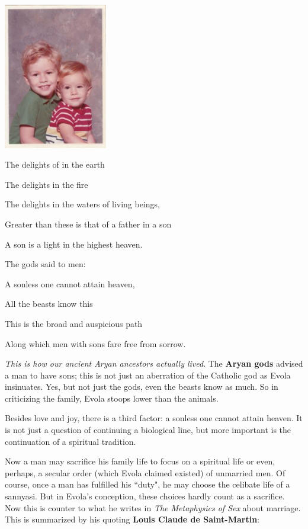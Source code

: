 \begin{quotex}
 \includegraphics[width=4.53cm,height=6.392cm]{a20120403TheSonofDuty-img001.jpg} 

The delights of in the earth

The delights in the fire

The delights in the waters of living beings,

Greater than these is that of a father in a son

A son is a light in the highest heaven.

The gods said to men:

A sonless one cannot attain heaven,

All the beasts know this

This is the broad and auspicious path

Along which men with sons fare free from sorrow. 

\end{quotex}
\emph{This is how our ancient Aryan ancestors actually lived}. The \textbf{Aryan gods} advised a man to have sons; this is not just an aberration of the Catholic god as Evola insinuates. Yes, but not just the gods, even the beasts know as much. So in criticizing the family, Evola stoops lower than the animals.



Besides love and joy, there is a third factor: a sonless one cannot attain heaven. It is not just a question of continuing a biological line, but more important is the continuation of a spiritual tradition.

Now a man may sacrifice his family life to focus on a spiritual life or even, perhaps, a secular order (which Evola claimed existed) of unmarried men. Of course, once a man has fulfilled his ``duty", he may choose the celibate life of a sannyasi. But in Evola's conception, these choices hardly count as a sacrifice. Now this is counter to what he writes in \emph{The Metaphysics of Sex} about marriage. This is summarized by his quoting \textbf{Louis Claude de Saint-Martin}:

